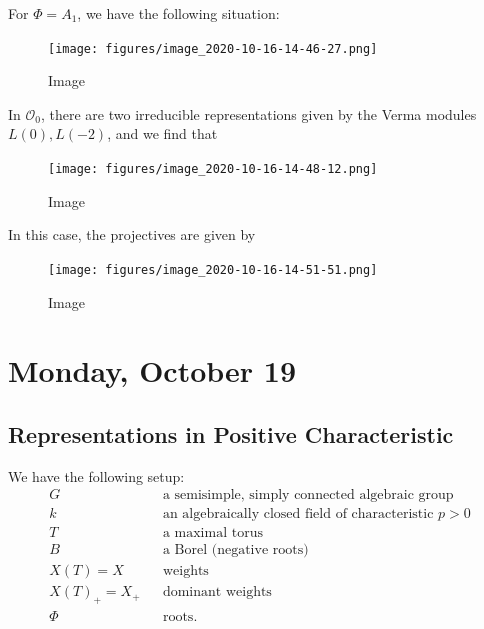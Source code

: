 \begin{example}

For \(\Phi = A_1\), we have the following situation:

\begin{figure}
\centering
\texttt{[image: figures/image\_2020-10-16-14-46-27.png]}
\caption{Image}
\end{figure}

In \({\mathcal{O}}_0\), there are two irreducible representations given
by the Verma modules \(L(0), L(-2)\), and we find that

\begin{figure}
\centering
\texttt{[image: figures/image\_2020-10-16-14-48-12.png]}
\caption{Image}
\end{figure}

In this case, the projectives are given by

\begin{figure}
\centering
\texttt{[image: figures/image\_2020-10-16-14-51-51.png]}
\caption{Image}
\end{figure}

\end{example}

\hypertarget{monday-october-19}{%
\section{Monday, October 19}\label{monday-october-19}}


\hypertarget{representations-in-positive-characteristic}{%
\subsection{Representations in Positive
Characteristic}\label{representations-in-positive-characteristic}}

We have the following setup:
\begin{align*}  
G && \text{a semisimple, simply connected algebraic group} \\
k && \text{an algebraically closed field of characteristic $p>0$} \\
T && \text{a maximal torus} \\
B && \text{a Borel (negative roots)} \\
X(T) = X && \text{weights} \\
X(T)_+ = X_+ && \text{dominant weights} \\
\Phi && \text{roots}
.\end{align*}

